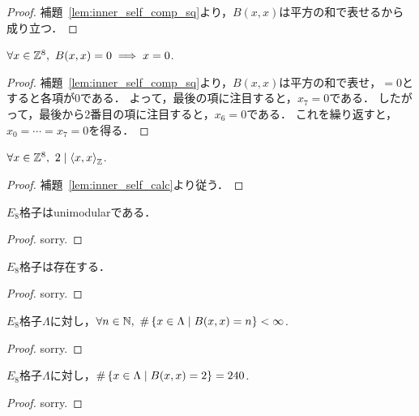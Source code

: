 \begin{proof}
  \leanok
  補題~\ref{lem:inner_self_comp_sq}より，$B(x, x)$は平方の和で表せるから成り立つ．
\end{proof}

\begin{theorem}
  \label{thm:inner_self_eq_zero}
  \leanok
  $\forall x \in \mathbb{Z}^8,\ B(x, x) = 0 \implies x = 0$.
\end{theorem}

\begin{proof}
  \leanok
  補題~\ref{lem:inner_self_comp_sq}より，$B(x, x)$は平方の和で表せ，$= 0$とすると各項が$0$である．
  よって，最後の項に注目すると，$x_7 = 0$である．
  したがって，最後から2番目の項に注目すると，$x_6 = 0$である．
  これを繰り返すと，$x_0 = \cdots = x_7 = 0$を得る．
\end{proof}

\begin{theorem}
  \label{thm:even}
  \leanok
  $\forall x \in \mathbb{Z}^8,\ 2 \mid \left\langle x, x \right\rangle_{\mathbb{Z}}$.
\end{theorem}

\begin{proof}
  \leanok
  補題~\ref{lem:inner_self_calc}より従う．
\end{proof}

\begin{theorem}
  \label{thm:unimodular}
  \leanok
  $E_8$格子はunimodularである．
\end{theorem}

\begin{proof}
  sorry.
\end{proof}

\begin{theorem}
  \label{thm:exists_E8}
  \leanok
  $E_8$格子は存在する．
\end{theorem}

\begin{proof}
  sorry.
\end{proof}

\begin{theorem}
  $E_8$格子$\Lambda$に対し，$\forall n \in \mathbb{N},\ \#\left\lbrace x \in \Lambda \mathrel{} \middle| \mathrel{} B(x, x) = n \right\rbrace < \infty$.
\end{theorem}

\begin{proof}
  sorry.
\end{proof}

\begin{lemma}
  \label{lem:card_norm_2}
  \leanok
  $E_8$格子$\Lambda$に対し，$\#\left\lbrace x \in \Lambda \mathrel{} \middle| \mathrel{} B(x, x) = 2 \right\rbrace = 240$.
\end{lemma}

\begin{proof}
  sorry.
\end{proof}
